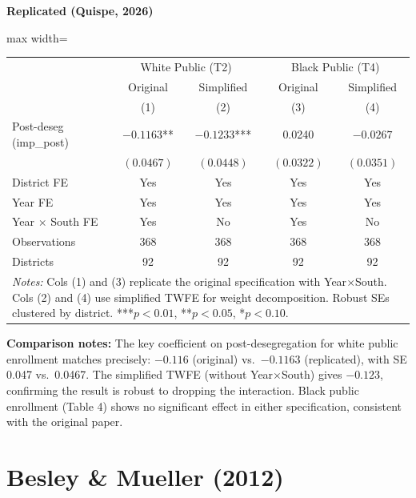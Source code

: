 \documentclass[11pt,a4paper]{article}
\begin{document}
\begin{minipage}[t]{0.48\textwidth}
\centering
\textbf{\large Replicated (Quispe, 2026)}
\vspace{0.3cm}

\begin{adjustbox}{max width=\textwidth}
\begin{tabular}{lcccc}
\toprule
 & \multicolumn{2}{c}{White Public (T2)} & \multicolumn{2}{c}{Black Public (T4)} \\
 & Original & Simplified & Original & Simplified \\
 & (1) & (2) & (3) & (4) \\
\midrule
Post-deseg (imp\_post) & $-0.1163$** & $-0.1233$*** & 0.0240 & $-0.0267$ \\
 & $(0.0467)$ & $(0.0448)$ & $(0.0322)$ & $(0.0351)$ \\[0.3em]
\midrule
District FE & Yes & Yes & Yes & Yes \\
Year FE & Yes & Yes & Yes & Yes \\
Year $\times$ South FE & Yes & No & Yes & No \\
Observations & 368 & 368 & 368 & 368 \\
Districts & 92 & 92 & 92 & 92 \\
\bottomrule
\multicolumn{5}{p{0.95\textwidth}}{\footnotesize\textit{Notes:} Cols (1) and (3) replicate the original specification with Year$\times$South. Cols (2) and (4) use simplified TWFE for weight decomposition. Robust SEs clustered by district. ***$p<0.01$, **$p<0.05$, *$p<0.10$.}
\end{tabular}
\end{adjustbox}
\end{minipage}

\vspace{1cm}
\textbf{Comparison notes:} The key coefficient on post-desegregation for white public enrollment matches precisely: $-0.116$ (original) vs.\ $-0.1163$ (replicated), with SE 0.047 vs.\ 0.0467. The simplified TWFE (without Year$\times$South) gives $-0.123$, confirming the result is robust to dropping the interaction. Black public enrollment (Table 4) shows no significant effect in either specification, consistent with the original paper.

\newpage

\section{Besley \& Mueller (2012)}
\end{document}
